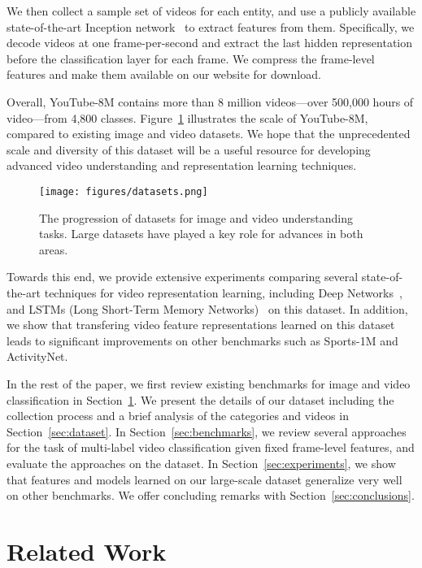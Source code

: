 \documentclass{sig-alternate-05-2015}
\begin{document}
We then collect a sample set of videos for each entity, and use a publicly available state-of-the-art Inception network~\cite{tensorflowimage} to extract features from them.
Specifically, we decode videos at one frame-per-second and extract the last hidden representation
before the classification layer for each frame. We compress the frame-level features and make
them available on our website for download.

Overall, YouTube-8M contains more than 8 million videos---over 500,000 hours
of video---from 4,800 classes. Figure~\ref{fig:datasets} illustrates the
scale of YouTube-8M, compared to existing image and video datasets.
We hope that the unprecedented scale and diversity of this dataset will be a
useful resource for developing advanced video understanding and representation
learning techniques.

\begin{figure}[t]
  \centering
  \texttt{[image: figures/datasets.png]}
  \caption{\small The progression of datasets for image and video understanding tasks. Large datasets have played a key role for advances in both areas.}
\label{fig:datasets}
\end{figure}

Towards this end, we provide extensive experiments comparing several state-of-the-art techniques for video representation learning, including
Deep Networks~\cite{beyond}, and LSTMs (Long Short-Term Memory Networks)~\cite{hochreiter97long} on this dataset. In addition, we show that transfering video feature representations learned on this dataset leads to significant improvements on other benchmarks such as Sports-1M and ActivityNet.

In the rest of the paper, we first review existing benchmarks for image and video classification in Section~\ref{sec:related}. We present the details of our dataset including the
collection process and a brief analysis of the categories and videos in Section~\ref{sec:dataset}. In Section~\ref{sec:benchmarks}, we review several approaches for the task of multi-label video classification given fixed frame-level features, and evaluate the approaches on the dataset. In Section~\ref{sec:experiments}, we show that features and models learned on our large-scale dataset generalize very well on other benchmarks. We offer concluding remarks with Section~\ref{sec:conclusions}.

 
\section{Related Work}
\label{sec:related}
\end{document}
